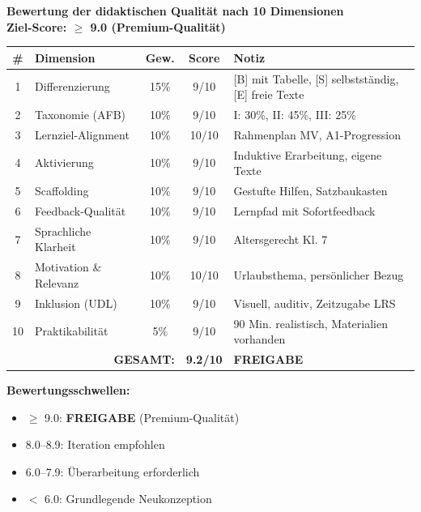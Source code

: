 \documentclass[11pt,a4paper]{article}
\begin{document}
\begin{scorebox}
\textbf{Bewertung der didaktischen Qualität nach 10 Dimensionen}\\
\textbf{Ziel-Score: $\geq$ 9.0 (Premium-Qualität)}

\vspace{1em}
\begin{tabular}{|c|l|c|c|p{4.5cm}|}
\hline
\textbf{\#} & \textbf{Dimension} & \textbf{Gew.} & \textbf{Score} & \textbf{Notiz} \\
\hline
1 & Differenzierung & 15\% & 9/10 & [B] mit Tabelle, [S] selbstständig, [E] freie Texte \\
\hline
2 & Taxonomie (AFB) & 10\% & 9/10 & I: 30\%, II: 45\%, III: 25\% \\
\hline
3 & Lernziel-Alignment & 10\% & 10/10 & Rahmenplan MV, A1-Progression \\
\hline
4 & Aktivierung & 10\% & 9/10 & Induktive Erarbeitung, eigene Texte \\
\hline
5 & Scaffolding & 10\% & 9/10 & Gestufte Hilfen, Satzbaukasten \\
\hline
6 & Feedback-Qualität & 10\% & 9/10 & Lernpfad mit Sofortfeedback \\
\hline
7 & Sprachliche Klarheit & 10\% & 9/10 & Altersgerecht Kl. 7 \\
\hline
8 & Motivation \& Relevanz & 10\% & 10/10 & Urlaubsthema, persönlicher Bezug \\
\hline
9 & Inklusion (UDL) & 10\% & 9/10 & Visuell, auditiv, Zeitzugabe LRS \\
\hline
10 & Praktikabilität & 5\% & 9/10 & 90 Min. realistisch, Materialien vorhanden \\
\hline
\multicolumn{3}{|r|}{\textbf{GESAMT:}} & \textbf{9.2/10} & \textcolor{successgreen}{\textbf{FREIGABE}} \\
\hline
\end{tabular}

\vspace{1em}
\textbf{Bewertungsschwellen:}
\begin{itemize}
    \item[\checkmark] \textcolor{successgreen}{$\geq$ 9.0: \textbf{FREIGABE} (Premium-Qualität)}
    \item[$\Box$] \textcolor{warningorange}{8.0--8.9: Iteration empfohlen}
    \item[$\Box$] 6.0--7.9: Überarbeitung erforderlich
    \item[$\Box$] $<$ 6.0: Grundlegende Neukonzeption
\end{itemize}
\end{scorebox}
\end{document}
